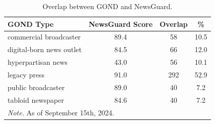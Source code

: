 \begin{table}[H]
\caption{Overlap between GOND and NewsGuard.}
\label{tab:overlap_lists}
\begin{tabularx}{\textwidth}{X c c c}
\toprule
GOND Type & NewsGuard Score & Overlap & \% \\
\midrule
commercial broadcaster & 89.4 & 58 & 10.5 \\
digital-born news outlet & 84.5 & 66 & 12.0 \\
hyperpartisan news & 43.0 & 56 & 10.1 \\
legacy press & 91.0 & 292 & 52.9 \\
public broadcaster & 89.0 & 40 & 7.2 \\
tabloid newspaper & 84.6 & 40 & 7.2 \\
\bottomrule
\multicolumn{3}{l}{\textit{Note.} As of September 15th, 2024.}
\end{tabularx}
\end{table}
